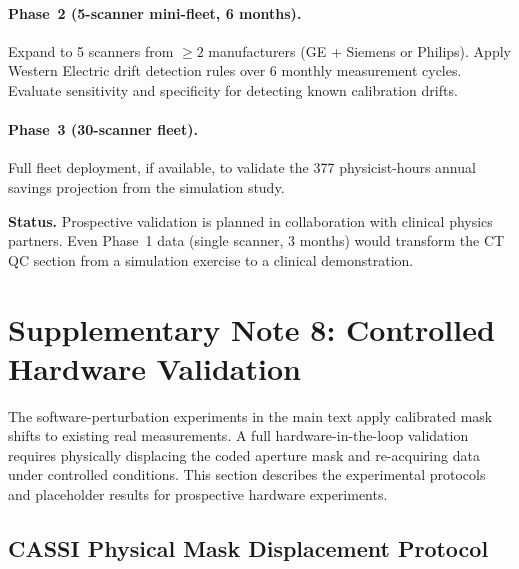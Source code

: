 \documentclass[11pt]{article}
\theoremstyle{definition}
\begin{document}
\paragraph{Phase~2 (5-scanner mini-fleet, 6 months).}
Expand to 5 scanners from $\geq 2$ manufacturers (GE + Siemens or Philips).
Apply Western Electric drift detection rules over 6 monthly measurement
cycles.  Evaluate sensitivity and specificity for detecting known
calibration drifts.

\paragraph{Phase~3 (30-scanner fleet).}
Full fleet deployment, if available, to validate the 377 physicist-hours
annual savings projection from the simulation study.

\noindent\textbf{Status.}  Prospective validation is planned in collaboration
with clinical physics partners.  Even Phase~1 data (single scanner, 3 months)
would transform the CT QC section from a simulation exercise to a clinical
demonstration.

\newpage
\section{Supplementary Note 8: Controlled Hardware Validation}
\label{sec:hardware_validation}

The software-perturbation experiments in the main text apply calibrated
mask shifts to existing real measurements.  A full hardware-in-the-loop
validation requires physically displacing the coded aperture mask and
re-acquiring data under controlled conditions.  This section describes
the experimental protocols and placeholder results for prospective
hardware experiments.

\subsection{CASSI Physical Mask Displacement Protocol}
\end{document}
